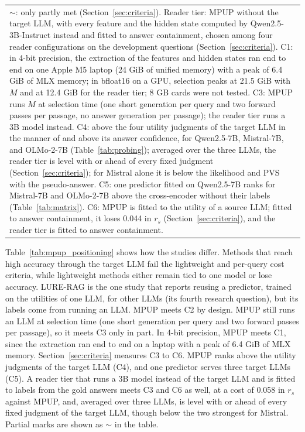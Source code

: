\documentclass[preprint,12pt,authoryear]{elsarticle}
\begin{document}
\begin{table}[htbp]
\begin{tabular}{lcccccc}
        \bottomrule
        \multicolumn{7}{p{0.93\columnwidth}}{\footnotesize $\sim$: only partly met (Section~\ref{sec:criteria}). Reader tier: MPUP without the target LLM, with every feature and the hidden state computed by Qwen2.5-3B-Instruct instead and fitted to answer containment, chosen among four reader configurations on the development questions (Section~\ref{sec:criteria}). C1: in 4-bit precision, the extraction of the features and hidden states ran end to end on one Apple M5 laptop (24 GiB of unified memory) with a peak of 6.4 GiB of MLX memory; in bfloat16 on a GPU, selection peaks at 21.5 GiB with $M$ and at 12.4 GiB for the reader tier; 8 GB cards were not tested. C3: MPUP runs $M$ at selection time (one short generation per query and two forward passes per passage, no answer generation per passage); the reader tier runs a 3B model instead. C4: above the four utility judgments of the target LLM in the manner of \citet{zhang2025c} and above its answer confidence, for Qwen2.5-7B, Mistral-7B, and OLMo-2-7B (Table~\ref{tab:probing}); averaged over the three LLMs, the reader tier is level with or ahead of every fixed judgment (Section~\ref{sec:criteria}); for Mistral alone it is below the likelihood and PVS with the pseudo-answer. C5: one predictor fitted on Qwen2.5-7B ranks for Mistral-7B and OLMo-2-7B above the cross-encoder without their labels (Table~\ref{tab:matrix}). C6: MPUP is fitted to the utility of a source LLM; fitted to answer containment, it loses 0.044 in $r_s$ (Section~\ref{sec:criteria}), and the reader tier is fitted to answer containment.} \\
    \end{tabular}
\end{table}

Table~\ref{tab:mpup_positioning} shows how the studies differ. Methods that reach high accuracy through the target LLM \citep{zhang2025c,dai2025} fail the lightweight and per-query cost criteria, while lightweight methods \citep{perez2025,tian2026} either remain tied to one model or lose accuracy. LURE-RAG \citep{chandra2026} is the one study that reports reusing a predictor, trained on the utilities of one LLM, for other LLMs (its fourth research question), but its labels come from running an LLM. MPUP meets C2 by design. MPUP still runs an LLM at selection time (one short generation per query and two forward passes per passage), so it meets C3 only in part. In 4-bit precision, MPUP meets C1, since the extraction ran end to end on a laptop with a peak of 6.4 GiB of MLX memory. Section~\ref{sec:criteria} measures C3 to C6. MPUP ranks above the utility judgments of the target LLM (C4), and one predictor serves three target LLMs (C5). A reader tier that runs a 3B model instead of the target LLM and is fitted to labels from the gold answers meets C3 and C6 as well, at a cost of 0.058 in $r_s$ against MPUP, and, averaged over three LLMs, is level with or ahead of every fixed judgment of the target LLM, though below the two strongest for Mistral. Partial marks are shown as $\sim$ in the table.
\end{document}
